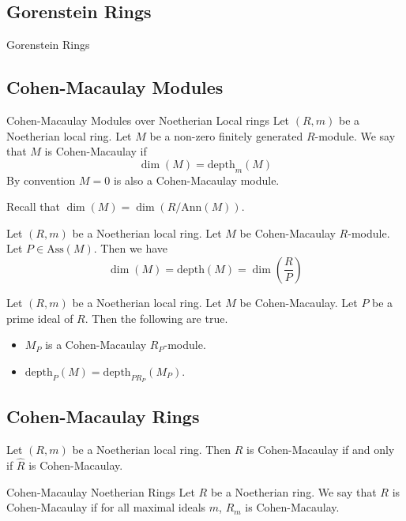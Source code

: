 \documentclass[a4paper]{article}
\begin{document}
\subsection{Gorenstein Rings}
\begin{defn}{Gorenstein Rings}{}
\end{defn}

\subsection{Cohen-Macaulay Modules}
\begin{defn}{Cohen-Macaulay Modules over Noetherian Local rings}{} Let $(R,m)$ be a Noetherian local ring. Let $M$ be a non-zero finitely generated $R$-module. We say that $M$ is Cohen-Macaulay if $$\dim(M)=\text{depth}_m(M)$$ By convention $M=0$ is also a Cohen-Macaulay module. 
\end{defn}

Recall that $\dim(M)=\dim(R/\text{Ann}(M))$. 

\begin{prp}{}{} Let $(R,m)$ be a Noetherian local ring. Let $M$ be Cohen-Macaulay $R$-module. Let $P\in\text{Ass}(M)$. Then we have $$\dim(M)=\text{depth}(M)=\dim\left(\frac{R}{P}\right)$$
\end{prp}

\begin{prp}{}{} Let $(R,m)$ be a Noetherian local ring. Let $M$ be Cohen-Macaulay. Let $P$ be a prime ideal of $R$. Then the following are true. 
\begin{itemize}
\item $M_P$ is a Cohen-Macaulay $R_P$-module. 
\item $\text{depth}_P(M)=\text{depth}_{PR_P}(M_P)$. 
\end{itemize}
\end{prp}

\subsection{Cohen-Macaulay Rings}
\begin{prp}{}{} Let $(R,m)$ be a Noetherian local ring. Then $R$ is Cohen-Macaulay if and only if $\widehat{R}$ is Cohen-Macaulay. 
\end{prp}

\begin{defn}{Cohen-Macaulay Noetherian Rings}{} Let $R$ be a Noetherian ring. We say that $R$ is Cohen-Macaulay if for all maximal ideals $m$, $R_m$ is Cohen-Macaulay. 
\end{defn}
\end{document}
